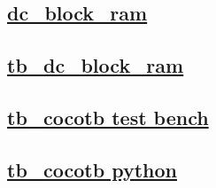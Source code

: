 \documentclass{article}
\begin{document}
  


  \subsection{\href{../files/dc_block_ram-v.html}{dc\_block\_ram}}
  \subsection{\href{../files2/tb_dc_block_ram-v.html}{tb\_dc\_block\_ram}}
  \subsection{\href{../files2/tb_cocotb-v.html}{tb\_cocotb test bench}}
  \subsection{\href{../files2/tb_cocotb-py.html}{tb\_cocotb python}}
\end{document}
